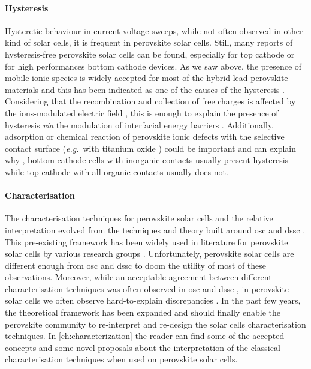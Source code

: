	\paragraph{Hysteresis}
	Hysteretic behaviour in current-voltage sweeps, while not often observed in other kind of solar cells, it is frequent in perovskite solar cells.
	Still, many reports of hysteresis-free perovskite solar cells can be found, especially for top cathode or for high performances bottom cathode devices.
	As we saw above, the presence of mobile ionic species is widely accepted for most of the hybrid lead perovskite materials and this has been indicated as one of the causes of the hysteresis \cite{Unger2014,Xiao2015}.
	Considering that the recombination and collection of free charges is affected by the ions-modulated electric field \cite{Pockett2017}, this is enough to explain the presence of hysteresis \cite{Tress2015,Calado2016} \textsl{via} the modulation of interfacial energy barriers \cite{Moia2019}.
	Additionally, adsorption or chemical reaction of perovskite ionic defects with the selective contact surface (\textsl{e.g.}\ with titanium oxide \cite{Yu2016,Beilsten-Edmands2015,Carrillo2016}) could be important and can explain why \cite{Moia2019}, bottom cathode cells with inorganic contacts usually present hysteresis while top cathode with all-organic contacts usually does not.



	\paragraph{Characterisation}
	The characterisation techniques for perovskite solar cells and the relative interpretation evolved from the techniques and theory built around \gls{osc} and \gls{dssc} \cite{Barnes2013}.
	This pre-existing framework has been widely used in literature for perovskite solar cells by various research groups \cite{ORegan2015b,Shao2016,Gelmetti2019,Kiermasch2018,Carnie2015}.
	Unfortunately, perovskite solar cells are different enough from \gls{osc} and \gls{dssc} to doom the utility of most of these observations.
	Moreover, while an acceptable agreement between different characterisation techniques was often observed in \gls{osc} \cite{Clarke2015,Maurano2011,Foertig2012} and \gls{dssc} \cite{Barnes2013}, in perovskite solar cells we often observe hard-to-explain discrepancies \cite{Kiermasch2018}.
	In the past few years, the theoretical framework has been expanded and should finally enable the perovskite community to re-interpret and re-design the solar cells characterisation techniques.
	In \cref{ch:characterization} the reader can find some of the accepted concepts and some novel proposals about the interpretation of the classical characterisation techniques when used on perovskite solar cells.

